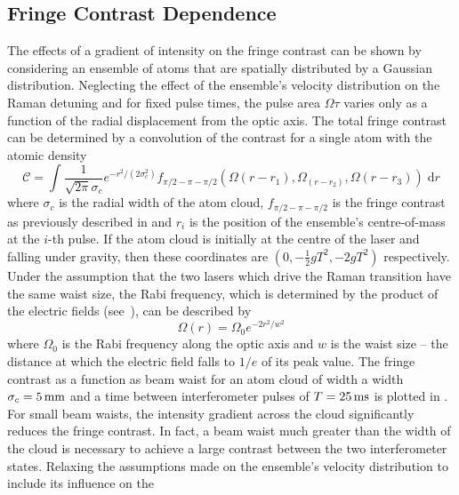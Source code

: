 \subsection{Fringe Contrast Dependence}\label{subsec:fringe_contrast}
The effects of a gradient of intensity on the fringe contrast can be shown by
considering an ensemble of atoms that are spatially distributed by a Gaussian
distribution. Neglecting the effect of the ensemble's velocity distribution on
the Raman detuning and for fixed pulse times, the pulse area \(\Omega \tau\)
varies only as a function of the radial displacement from the optic axis. The
total fringe contrast can be determined by a convolution of the contrast for a
single atom with the atomic density
\begin{equation}
	\mathcal{C} = \int \frac{1}{\sqrt{2\pi}\sigma_c}e^{-r^2/(2\sigma_c^2)} f_{\pi/2-\pi-\pi/2}\left(\Omega(r-r_1),\Omega_(r-r_2),\Omega(r-r_3)\right) \;\mathrm{d}r
	\label{eq:cloud_contrast}
\end{equation}
where \(\sigma_c\) is the radial width of the atom cloud,
\(f_{\pi/2-\pi-\pi/2}\) is the fringe contrast as previously described in
 and \(r_i\) is the position of the ensemble's
centre-of-mass at the \(i\)-th pulse. If the atom cloud is initially at the
centre of the laser and falling under gravity, then these coordinates are
\(\left(0, -\frac{1}{2}g T^2, -2 g T^2\right)\) respectively. Under the
assumption that the two lasers which drive the Raman transition have the same
waist size, the Rabi frequency, which is determined by the product of the
electric fields (see~), can be described by
\begin{equation}
	\Omega(r) = \Omega_0 e^{-2 r^2/w^2}
\end{equation}
where \(\Omega_0\) is the Rabi frequency along the optic axis and \(w\) is the
waist size -- the distance at which the electric field falls to \(1/e\) of its
peak value. The fringe contrast as a function as beam waist for an atom cloud of
width a width \(\sigma_c = \sivalue{5}{\milli\metre}\) and a time between
interferometer pulses of \(T = \sivalue{25}{\milli\second}\) is plotted in
. For small beam waists, the intensity
gradient across the cloud significantly reduces the fringe contrast. In fact, a
beam waist much greater than the width of the cloud is necessary to achieve a
large contrast between the two interferometer states. Relaxing the assumptions
made on the ensemble's velocity distribution to include its influence on the
